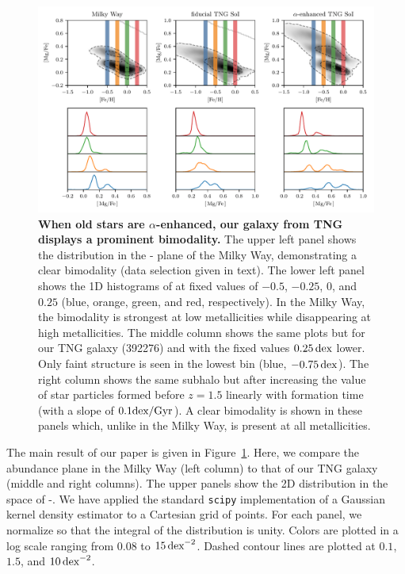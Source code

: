 \begin{figure}
  \centering
  \includegraphics[width=\textwidth]{ch4/392276.pdf}
  \caption{\textbf{When old stars are $\alpha$-enhanced, our galaxy from TNG displays a prominent bimodality.} The upper left panel shows the distribution in the \MgFe{}-\FeH{} plane of the Milky Way, demonstrating a clear bimodality (data selection given in text). The lower left panel shows the 1D histograms of \MgFe{} at fixed \FeH{} values of $-0.5$, $-0.25$, $0$, and $0.25$ (blue, orange, green, and red, respectively). In the Milky Way, the bimodality is strongest at low metallicities while disappearing at high metallicities. The middle column shows the same plots but for our TNG galaxy (392276) and with the fixed \FeH{} values $0.25\,\textrm{dex}$ lower. Only faint structure is seen in the lowest bin (blue, $-0.75\,\textrm{dex}$). The right column shows the same subhalo but after increasing the \MgFe{} value of star particles formed before $z=1.5$ linearly with formation time (with a slope of $0.1\textrm{dex}/\textrm{Gyr}$). A clear bimodality is shown in these panels which, unlike in the Milky Way, is present at all metallicities.}
  \label{fig:fig1}
\end{figure}

The main result of our paper is given in Figure~\ref{fig:fig1}. Here, we compare the abundance plane in the Milky Way (left column) to that of our TNG galaxy (middle and right columns). The upper panels show the 2D distribution in the space of \MgFe{}-\FeH{}. We have applied the standard \texttt{scipy} implementation of a Gaussian kernel density estimator to a Cartesian grid of points. For each panel, we normalize so that the integral of the distribution is unity. Colors are plotted in a log scale ranging from $0.08$ to $15\,\textrm{dex}^{-2}$. Dashed contour lines are plotted at $0.1$, $1.5$, and $10\,\textrm{dex}^{-2}$.

